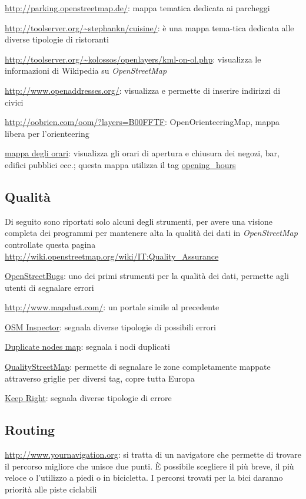 \documentclass[a4paper,twoside,12pt,]{article}
\newcommand{\osm}{\emph{OpenStreetMap}\xspace}
\begin{document}
\url{http://parking.openstreetmap.de/}: mappa tematica dedicata ai parcheggi

\url{http://toolserver.org/~stephankn/cuisine/}: è una mappa tema-tica dedicata alle diverse tipologie di ristoranti

\url{http://toolserver.org/~kolossos/openlayers/kml-on-ol.php}: visualizza le informazioni di Wikipedia su \osm

\url{http://www.openaddresses.org/}: visualizza e permette di inserire indirizzi di civici

\url{http://oobrien.com/oom/?layers=B00FFTF}: OpenOrienteeringMap, mappa libera per l'orienteering

\href{http://www.netzwolf.info/kartografie/osm/time_domain/map_opening}{mappa degli orari}: visualizza gli orari di apertura e chiusura dei negozi, bar, edifici pubblici ecc.; questa mappa utilizza il tag \href{http://wiki.openstreetmap.org/wiki/Opening_hours}{opening\_hours}

\subsection{Qualità}
Di seguito sono riportati solo alcuni degli strumenti, per avere una visione completa dei programmi per mantenere alta la qualità dei dati in \osm controllate questa pagina \url{http://wiki.openstreetmap.org/wiki/IT:Quality_Assurance}

\href{http://openstreetbugs.schokokeks.org/}{OpenStreetBugs}: uno dei primi strumenti per la qualità dei dati, permette agli utenti di segnalare errori

\url{http://www.mapdust.com/}: un portale simile al precedente

\href{http://tools.geofabrik.de/osmi/}{OSM Inspector}: segnala diverse tipologie di possibili errori

\href{http://matt.dev.openstreetmap.org/dupe_nodes/}{Duplicate nodes map}: segnala i nodi duplicati

\href{http://osmqa2.qualitystreetmap.org/}{QualityStreetMap}: permette di segnalare le zone completamente mappate attraverso griglie per diversi tag, copre tutta Europa

\href{http://keepright.ipax.at/}{Keep Right}: segnala diverse tipologie di errore

\subsection{Routing}
\url{http://www.yournavigation.org}: si tratta di un navigatore che permette di trovare il percorso migliore che unisce due punti. È possibile scegliere il più breve, il più veloce o l'utilizzo a piedi o in bicicletta. I percorsi trovati per la bici daranno priorità alle piste ciclabili
\end{document}
